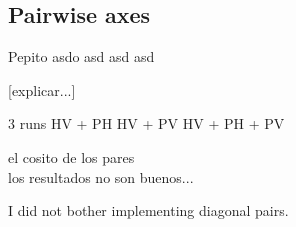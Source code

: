 \subsection{Pairwise axes}

Pepito  asdo  asd asd asd

[explicar...]

3 runs
HV + PH
HV + PV
HV + PH + PV

el cosito de los pares \\

los resultados no son buenos...

I did not bother implementing diagonal pairs.
